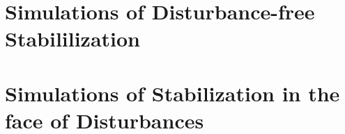 \documentclass[a4paper,11pt,twoside]{book}
\begin{document}
    
    
    
    

  \chapter{Simulations of Disturbance-free Stabililization}
    \label{chapter:simulations_without_disturbances}

    
    

  \chapter{Simulations of Stabilization in the face of Disturbances}
    \label{chapter:simulations_with_disturbances}

    
    





\end{document}
